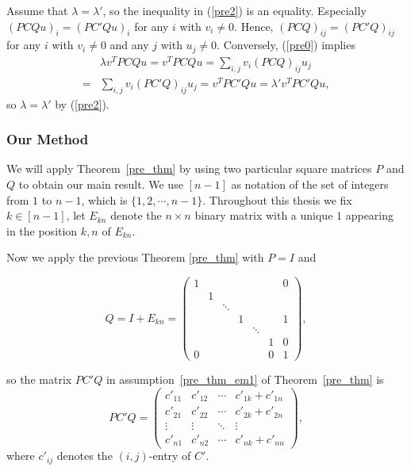 \documentclass{beamer}
\begin{document}
\begin{frame}
    Assume that $\lambda=\lambda'$, so the inequality in (\ref{pre2}) is an equality.
        Especially $(PCQu)_i=(PC'Qu)_i$ for any $i$ with $v_i\not=0.$ Hence,
        $(PCQ)_{ij}=(PC'Q)_{ij}$ for any $i$ with $v_i\not=0$ and any $j$ with
        $u_j\not=0.$ Conversely, (\ref{pre0}) implies
        \begin{align*} &\lambda v^TPCQu=v^TPCQu=\sum_{i,j} v_i(PCQ)_{ij}u_j\\ =&
         \sum_{i,j} v_i(PC'Q)_{ij}u_j=v^TPC'Qu=\lambda'v^TPC'Qu,
         \end{align*} so $\lambda=\lambda'$ by (\ref{pre2}).
\end{frame}

\begin{frame}
    \frametitle{Our Method}
    We will apply Theorem~\ref{pre_thm} by using two particular square matrices $P$ and $Q$ to obtain our main result. 
We use $[n-1]$ as notation of the set of integers from $1$ to $n-1$, which is $\{1,2,\cdots,n-1\}$.
Throughout this thesis we fix $k\in [n-1]$, let $E_{kn}$ denote the $n\times n$ binary matrix with a unique $1$
appearing in the position $k,n$ of $E_{kn}$.
\end{frame}

\begin{frame}
    Now we apply the previous Theorem \ref{pre_thm} with $P=I$ and


    \begin{equation} \label{Q_1}
    Q=I+E_{kn}=\begin{pmatrix}
    1 &   &        &       &        &   & 0 \\
      & 1 &        &       &        &   &   \\
      &   & \ddots &       &        &   &   \\
      &   &        & 1     &        &   & 1 \\
      &   &        &       &\ddots  &   &  \\
      &   &        &       &        &1  & 0 \\
    0 &   &        &       &        &0  & 1
    \end{pmatrix},
    \end{equation}
\end{frame}

\begin{frame}
    so the matrix $PC'Q$ in assumption~\ref{pre_thm_em1} of Theorem~\ref{pre_thm} is
\begin{equation}\label{PC'Q}
  PC'Q=\begin{pmatrix}
         c'_{11} & c'_{12} & \cdots &  c'_{1k}+c'_{1n} \\
         c'_{21} & c'_{22} & \cdots &  c'_{2k}+c'_{2n} \\
         \vdots & \vdots & \ddots &  \vdots \\
         c'_{n1} & c'_{n2} & \cdots &  c'_{nk}+c'_{nn}
       \end{pmatrix},
\end{equation}
where $c'_{ij}$ denotes the $(i,j)$-entry of $C'$.
\end{frame}
\end{document}

